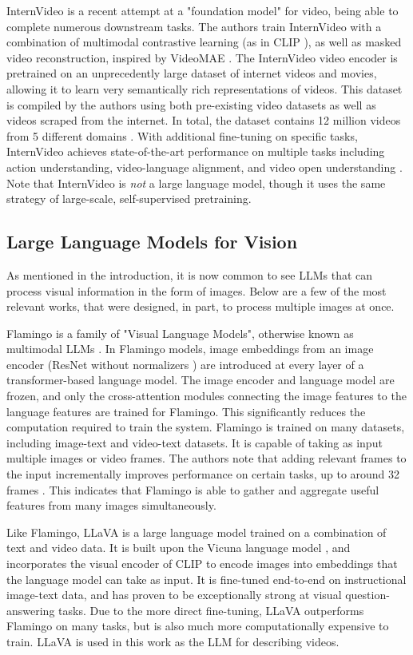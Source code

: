 InternVideo is a recent attempt at a "foundation model" for video, being able to complete numerous downstream tasks.
The authors train InternVideo with a combination of multimodal contrastive learning (as in CLIP \cite{clip}), as well as masked video reconstruction, inspired by VideoMAE \cite{videomae}.
The InternVideo video encoder is pretrained on an unprecedently large dataset of internet videos and movies, allowing it to learn very semantically rich representations of videos.
This dataset is compiled by the authors using both pre-existing video datasets as well as videos scraped from the internet. In total, the dataset contains 12 million videos from 5 different domains \cite{internvideo}.
With additional fine-tuning on specific tasks, InternVideo achieves state-of-the-art performance on multiple tasks including action understanding, video-language alignment, and video open understanding \cite{internvideo}.
Note that InternVideo is \textit{not} a large language model, though it uses the same strategy of large-scale, self-supervised pretraining.

\subsection{Large Language Models for Vision}

As mentioned in the introduction, it is now common to see LLMs that can process visual information in the form of images. 
Below are a few of the most relevant works, that were designed, in part, to process multiple images at once.

Flamingo is a family of "Visual Language Models", otherwise known as multimodal LLMs \cite{flamingo}.
In Flamingo models, image embeddings from an image encoder (ResNet without normalizers \cite{nfnet}) are introduced at every layer of a transformer-based language model.
The image encoder and language model are frozen, and only the cross-attention modules connecting the image features to the language features are trained for Flamingo.
This significantly reduces the computation required to train the system.
Flamingo is trained on many datasets, including image-text and video-text datasets. It is capable of taking as input multiple images or video frames. 
The authors note that adding relevant frames to the input incrementally improves performance on certain tasks, up to around 32 frames \cite{flamingo}.
This indicates that Flamingo is able to gather and aggregate useful features from many images simultaneously.

Like Flamingo, LLaVA \cite{llava} is a large language model trained on a combination of text and video data.
It is built upon the Vicuna language model \cite{vicuna}, and incorporates the visual encoder of CLIP \cite{clip} to encode images into embeddings that the language model can take as input.
It is fine-tuned end-to-end on instructional image-text data, and has proven to be exceptionally strong at visual question-answering tasks.
Due to the more direct fine-tuning, LLaVA outperforms Flamingo on many tasks, but is also much more computationally expensive to train.
LLaVA is used in this work as the LLM for describing videos.

